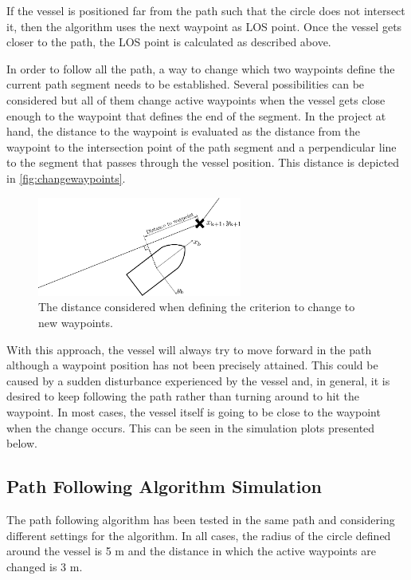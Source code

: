 If the vessel is positioned far from the path such that the circle does not intersect it, then the algorithm uses the next waypoint as LOS point. Once the vessel gets closer to the path, the LOS point is calculated as described above.

In order to follow all the path, a way to change which two waypoints define the current path segment needs to be established. Several possibilities can be considered but all of them change active waypoints when the vessel gets close enough to the waypoint that defines the end of the segment. In the project at hand, the distance to the waypoint is evaluated as the distance from the waypoint to the intersection point of the path segment and a perpendicular line to the segment that passes through the vessel position. This distance is depicted in \autoref{fig:changewaypoints}.
\begin{figure}[H]
	\includegraphics[width=0.6\textwidth]{figures/LOSalgorithmdistancewp}
	\caption{The distance considered when defining the criterion to change to new waypoints.}
	\label{fig:changewaypoints}
\end{figure}
With this approach, the vessel will always try to move forward in the path although a waypoint position has not been precisely attained. %
This could be caused by a sudden disturbance experienced by the vessel and, in general, it is desired to keep following the path rather than turning around to hit the waypoint. In most cases, the vessel itself is going to be close to the waypoint when the change occurs. This can be seen in the simulation plots presented below. 

\subsection{Path Following Algorithm Simulation}

The path following algorithm has been tested in the same path and considering different settings for the algorithm. In all cases, the radius of the circle defined around the vessel is 5 m and the distance in which the active waypoints are changed is 3 m. 

